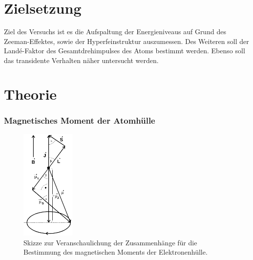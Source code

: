 \section{Zielsetzung}
\label{sec:Zielsetzung}
Ziel des Versuchs ist es die Aufspaltung der Energieniveaus auf Grund des Zeeman-Effektes,
sowie der Hyperfeinstruktur auszumessen. Des Weiteren soll der Landé-Faktor des Gesamtdrehimpulses
des Atoms bestimmt werden. Ebenso soll das transidente Verhalten näher untersucht
werden.

\section{Theorie}
\label{sec:Theorie}

\subsubsection{Magnetisches Moment der Atomhülle}
\label{sec:Atomhülle}

\begin{figure}
  \centering
  \includegraphics[height=5.5cm]{content/pictures/MagnMoment.png}
  \caption{Skizze zur Veranschaulichung der Zusammenhänge für die Bestimmung des magnetischen Moments der Elektronenhülle.}
  \label{fig:MagnMoment}
\end{figure}

\FloatBarrier


